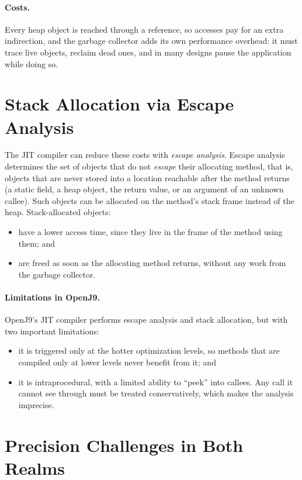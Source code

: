 \paragraph{Costs.} Every heap object is reached through a reference, so accesses pay for an
extra indirection, and the garbage collector adds its own performance overhead: it must trace
live objects, reclaim dead ones, and in many designs pause the application while doing so.

\section{Stack Allocation via Escape Analysis}

The JIT compiler can reduce these costs with \emph{escape analysis}.
Escape analysis determines the set of objects that do not \emph{escape} their allocating method,
that is, objects that are never stored into a location reachable after the method returns (a
static field, a heap object, the return value, or an argument of an unknown callee). Such
objects can be allocated on the method's stack frame instead of the heap. Stack-allocated
objects:
\begin{itemize}
  \item have a lower access time, since they live in the frame of the method using them; and
  \item are freed as soon as the allocating method returns, without any work from the garbage
        collector.
\end{itemize}

\paragraph{Limitations in OpenJ9.} OpenJ9's JIT compiler performs escape analysis and stack
allocation, but with two important limitations:
\begin{itemize}
  \item it is triggered only at the hotter optimization levels, so methods that are compiled
        only at lower levels never benefit from it; and
  \item it is intraprocedural, with a limited ability to ``peek'' into callees. Any call it
        cannot see through must be treated conservatively, which makes the analysis imprecise.
\end{itemize}

\section{Precision Challenges in Both Realms}
\label{sec:challenges}

